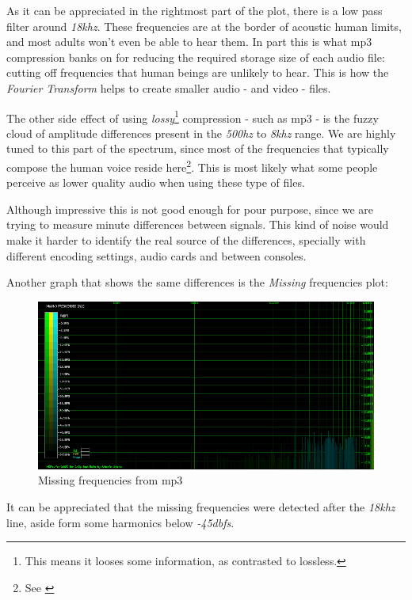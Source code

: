 \documentclass[10pt,a4paper]{report}
\newcommand{\fhz}[1]{\textit{#1\acrshort{hz}}}
\newcommand{\fkhz}[1]{\textit{#1\acrshort{khz}}}
\newcommand{\db}[1]{\textit{#1\acrshort{dbfs}}}
\begin{document}
As it can be appreciated in the rightmost part of the plot, there is a low pass filter around \fkhz{18}. These frequencies are at the border of acoustic human limits, and most adults won't even be able to hear them. In part this is what \acrshort{mp3} compression banks on for reducing the required storage size of each audio file: cutting off frequencies that human beings are unlikely to hear. This is how the \textit{Fourier Transform} helps to create smaller audio - and video - files.

The other side effect of using \textit{lossy}\footnote{This means it looses some information, as contrasted to lossless.} compression - such as \acrshort{mp3} - is the fuzzy cloud of amplitude differences present in the \fhz{500} to \fkhz{8} range. We are highly tuned to this part of the spectrum, since most of the frequencies that typically compose the human voice reside here\footnote{See \cite{humanvoice}}. This is most likely what some people perceive as lower quality audio when using these type of files.

Although impressive this is not good enough for pour purpose, since we are trying to measure minute differences between signals. This kind of noise would make it harder to identify the real source of the differences, specially with different encoding settings, audio cards and between consoles.

Another graph that shows the same differences is the \textit{Missing} frequencies plot:

\begin{figure}[H]
	\centering
	\includegraphics[width=1.0\linewidth]{images/interpretation/Plot6-mp3-3.png}
	\caption[MP3 Missing]{Missing frequencies from \acrshort{mp3}}
	\label{fig:plot6-mp3-3}
\end{figure}

It can be appreciated that the missing frequencies were detected after the \fkhz{18} line, aside form some harmonics below \db{-45}.
\end{document}
